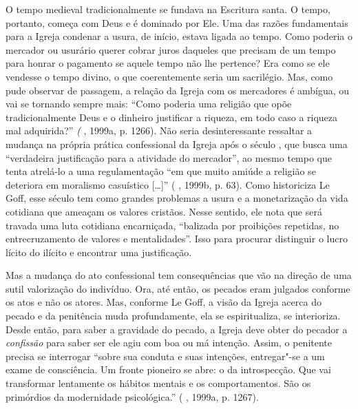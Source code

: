 O tempo medieval tradicionalmente se fundava na Escritura santa. O
tempo, portanto, começa com Deus e é dominado por Ele. Uma das razões
fundamentais para a Igreja condenar a usura, de início, estava ligada ao
tempo. Como poderia o mercador ou usurário querer cobrar juros daqueles
que precisam de um tempo para honrar o pagamento se aquele tempo não lhe
pertence? Era como se ele vendesse o tempo divino, o que coerentemente
seria um sacrilégio. Mas, como pude observar de passagem, a relação da Igreja com os
mercadores é ambígua, ou vai se tornando sempre mais: ``Como poderia uma
religião que opõe tradicionalmente Deus e o dinheiro justificar a
riqueza, em todo caso a riqueza mal adquirida?'' \emph{(} , 1999a,
p. 1266). Não seria desinteressante ressaltar a mudança na própria
prática confessional da Igreja após o século , que busca uma
``verdadeira justificação para a atividade do mercador'', ao mesmo tempo
que tenta atrelá-lo a uma regulamentação ``em que muito amiúde a
religião se deteriora em moralismo casuístico [\ldots{}]'' (
, 1999b, p. 63). Como historiciza Le Goff, esse século tem
como grandes problemas a usura e a monetarização da vida cotidiana que
ameaçam os valores cristãos. Nesse sentido, ele nota que será travada
uma luta cotidiana encarniçada, ``balizada por proibições repetidas, no
entrecruzamento de valores e mentalidades''. Isso para procurar
distinguir o lucro lícito do ilícito e encontrar uma justificação.

Mas a mudança do ato confessional tem consequências que vão na direção
de uma sutil valorização do indivíduo. Ora, até então, os pecados eram
julgados conforme os atos e não os atores. Mas, conforme Le Goff, a
visão da Igreja acerca do pecado e da penitência muda profundamente, ela
se espiritualiza, se interioriza. Desde então, para saber a gravidade do
pecado, a Igreja deve obter do pecador a \emph{confissão} para saber ser
ele agiu com boa ou má intenção. Assim, o penitente precisa se
interrogar ``sobre sua conduta e suas intenções, entregar"-se a um exame
de consciência. Um fronte pioneiro se abre: o da introspecção. Que vai
transformar lentamente os hábitos mentais e os comportamentos. São os
primórdios da modernidade psicológica.'' ( , 1999a, p. 1267).

